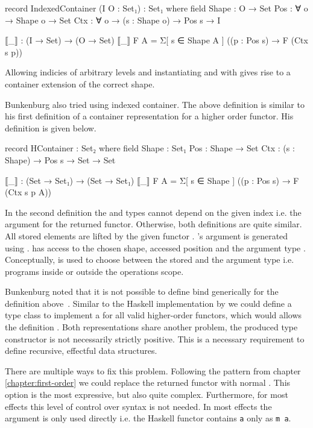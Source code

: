 \begin{code}
record IndexedContainer (I O : Set₁) : Set₁ where
  field
    Shape : O → Set
    Pos : ∀ {o} → Shape o → Set
    Ctx : ∀ {o} → (s : Shape o) → Pos s → I

  ⟦_⟧ : (I → Set) → (O → Set)
  ⟦_⟧ F A = Σ[ s ∈ Shape A ] ((p : Pos s) → F (Ctx s p))
\end{code}
Allowing indicies of arbitrary levels and instantiating  and
 with  gives rise to a container extension
of the correct shape.

Bunkenburg also tried using indexed container.
The above definition is similar to his first definition of a container
representation for a higher order functor.
His definition is given below.
\begin{code}
record HContainer : Set₂ where
  field
    Shape : Set₁
    Pos : Shape → Set
    Ctx : (s : Shape) → Pos s → Set → Set

  ⟦_⟧ : (Set → Set₁) → (Set → Set₁)
  ⟦_⟧ F A = Σ[ s ∈ Shape ] ((p : Pos s) → F (Ctx s p A))
\end{code}
In the second definition the  and  types cannot
depend on the given index i.e. the argument for the returned functor.
Otherwise, both definitions are quite similar.
All stored elements are lifted by the given functor .
's argument is generated using .
 has access to the chosen shape, accessed position and the 
argument type .
Conceptually,  is used to choose between the stored
 and the argument type  i.e. programs inside or
outside the operations scope.

Bunkenburg noted that it is not possible to define \AgdaFunction{>>=} bind
generically for the definition above~\cite{bunkenburg2019modeling}.
Similar to the Haskell implementation by \textcite{DBLP:conf/haskell/WuSH14} we
could define a type class to implement a  for all valid
higher-order functors, which would allows the definition \AgdaFunction{>>=}.
Both representations share another problem, the produced type constructor is not
necessarily strictly positive.
This is a necessary requirement to define recursive, effectful data structures.

There are multiple ways to fix this problem.
Following the pattern from chapter \ref{chapter:first-order} we could replace
the returned functor with normal .
This option is the most expressive, but also quite complex.
Furthermore, for most effects this level of control over syntax is not needed.
In most effects the argument  is only used directly i.e. the
Haskell functor contains \texttt{a} only as \texttt{m a}.

